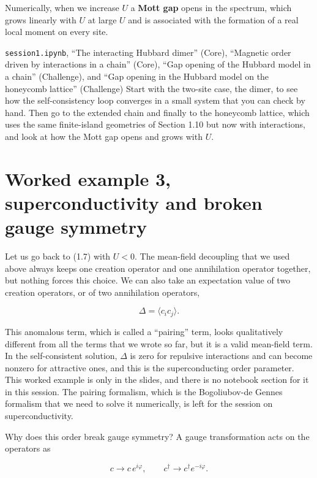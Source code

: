 Numerically, when we increase $U$ a \textbf{Mott gap} opens in the spectrum, which grows linearly
with $U$ at large $U$ and is associated with the formation of a real local moment on every site.

\begin{notebookbox}{\texttt{session1.ipynb}, ``The interacting Hubbard dimer'' (Core), ``Magnetic order driven by interactions in a chain'' (Core), ``Gap opening of the Hubbard model in a chain'' (Challenge), and ``Gap opening in the Hubbard model on the honeycomb lattice'' (Challenge)}
Start with the two-site case, the dimer, to see how the self-consistency loop converges in a small
system that you can check by hand. Then go to the extended chain and finally to the honeycomb
lattice, which uses the same finite-island geometries of Section 1.10 but now with interactions, and
look at how the Mott gap opens and grows with $U$.
\end{notebookbox}

\section{Worked example 3, superconductivity and broken gauge symmetry}

Let us go back to (1.7) with $U<0$. The mean-field decoupling that we used above always keeps one
creation operator and one annihilation operator together, but nothing forces this choice. We can
also take an expectation value of two creation operators, or of two annihilation operators,

\begin{equation}
\Delta = \langle c_i c_j\rangle.
\end{equation}

This anomalous term, which is called a ``pairing'' term, looks qualitatively different from all the
terms that we wrote so far, but it is a valid mean-field term. In the self-consistent solution,
$\Delta$ is zero for repulsive interactions and can become nonzero for attractive ones, and this is
the superconducting order parameter. This worked example is only in the slides, and there is no
notebook section for it in this session. The pairing formalism, which is the Bogoliubov-de Gennes
formalism that we need to solve it numerically, is left for the session on superconductivity.

Why does this order break gauge symmetry? A gauge transformation acts on the operators as

\begin{equation}
c \to c\, e^{i\varphi}, \qquad c^\dagger \to c^\dagger e^{-i\varphi}.
\end{equation}

